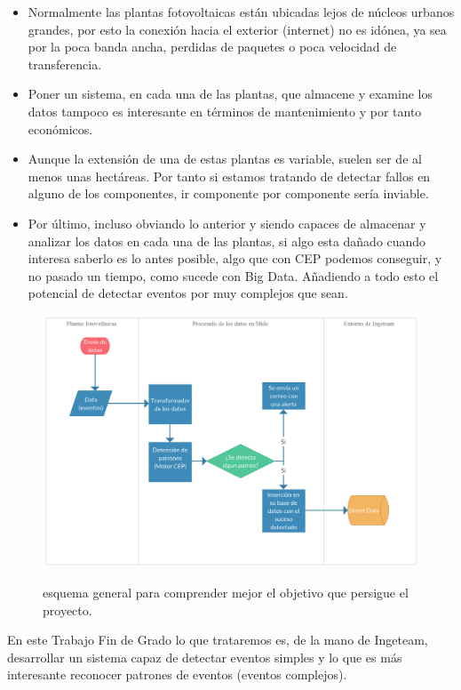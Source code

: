 \documentclass[a4paper]{article}
\begin{document}
\begin{itemize}
\item Normalmente las plantas fotovoltaicas están ubicadas lejos de núcleos urbanos grandes, por esto la conexión hacia el exterior (internet) no es idónea, ya sea por la poca banda ancha, perdidas de paquetes o poca velocidad de transferencia.
\item Poner un sistema, en cada una de las plantas, que almacene y examine los datos tampoco es interesante en términos de mantenimiento y por tanto económicos.
\item Aunque la extensión de una de estas plantas es variable, suelen ser de al menos unas hectáreas. Por tanto si estamos tratando de detectar fallos en alguno de los componentes, ir componente por componente sería inviable.
\item Por último, incluso obviando lo anterior y siendo capaces de almacenar y analizar los datos en cada una de las plantas, si algo esta dañado cuando interesa saberlo es lo antes posible, algo que con CEP podemos conseguir, y no pasado un tiempo, como sucede con Big Data. Añadiendo a todo esto el potencial de detectar eventos por muy complejos que sean.
\end{itemize}

\begin{figure}[ht]
    \centering
    {\includegraphics[width=150mm]{vision_general_fase_3.png}}
    \caption{esquema general para comprender mejor el objetivo que persigue el proyecto.}
    \label{fig:mesh1}
\end{figure}

En este Trabajo Fin de Grado lo que trataremos es, de la mano de Ingeteam, desarrollar un sistema capaz de detectar eventos simples y lo que es más interesante reconocer patrones de eventos (eventos complejos).
\end{document}
